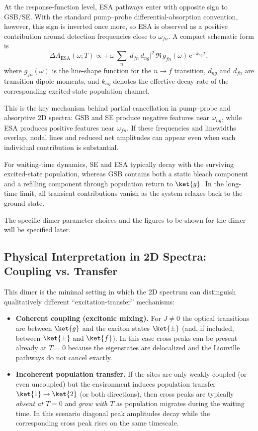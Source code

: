 At the response-function level, ESA pathways enter with opposite sign to GSB/SE. With the standard pump--probe differential-absorption convention, however, this sign is inverted once more, so ESA is observed as a positive contribution around detection frequencies close to $\omega_{fn}$. A compact schematic form is
\begin{equation*}
	\Delta A_{\mathrm{ESA}}(\omega;T)
	\propto
	+\,\omega\,\sum_{n}
	\bigl|d_{fn}\,d_{ng}\bigr|^2\,
	\Re\,g_{fn}(\omega)\,
	\mathrm{e}^{-k_{ng}T},
\end{equation*}
where $g_{fn}(\omega)$ is the line-shape function for the $n\to f$ transition, $d_{ng}$ and $d_{fn}$ are transition dipole moments, and $k_{ng}$ denotes the effective decay rate of the corresponding excited-state population channel.

This is the key mechanism behind partial cancellation in pump--probe and absorptive 2D spectra: GSB and SE produce negative features near $\omega_{ng}$, while ESA produces positive features near $\omega_{fn}$. If these frequencies and linewidths overlap, nodal lines and reduced net amplitudes can appear even when each individual contribution is substantial.

For waiting-time dynamics, SE and ESA typically decay with the surviving excited-state population, whereas GSB contains both a static bleach component and a refilling component through population return to $\ket{g}$. In the long-time limit, all transient contributions vanish as the system relaxes back to the ground state.


The specific dimer parameter choices and the figures to be shown for the dimer will be specified later.

\subsection{Physical Interpretation in 2D Spectra: Coupling vs. Transfer}
\label{sec:model_dimer_interpretation}


This dimer is the minimal setting in which the 2D spectrum can distinguish qualitatively different ``excitation-transfer'' mechanisms:
\begin{itemize}
	\item \textbf{Coherent coupling (excitonic mixing).} For $J\neq 0$ the optical transitions are between $\ket{g}$ and the exciton states $\ket{\pm}$ (and, if included, between $\ket{\pm}$ and $\ket{f}$). In this case cross peaks can be present already at $T=0$ because the eigenstates are delocalized and the Liouville pathways do not cancel exactly.
	\item \textbf{Incoherent population transfer.} If the sites are only weakly coupled (or even uncoupled) but the environment induces population transfer $\ket{1}\to\ket{2}$ (or both directions), then cross peaks are typically \emph{absent at $T=0$} and \emph{grow with $T$} as population migrates during the waiting time. In this scenario diagonal peak amplitudes decay while the corresponding cross peak rises on the same timescale.
\end{itemize}


